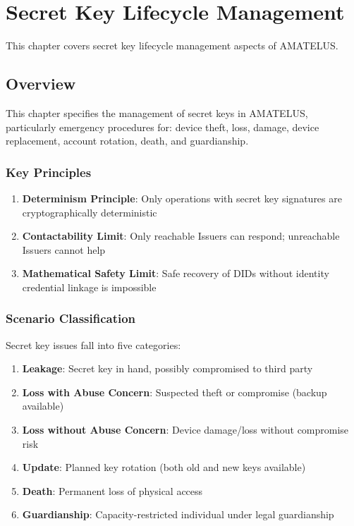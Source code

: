 
\chapter{Secret Key Lifecycle Management}


\begin{definition}
  \label{def:key-chapter}
  This chapter covers secret key lifecycle management aspects of AMATELUS.
  \leanok
\end{definition}
\section{Overview}

This chapter specifies the management of secret keys in AMATELUS, particularly emergency procedures for:
device theft, loss, damage, device replacement, account rotation, death, and guardianship.

\subsection{Key Principles}

\begin{enumerate}
  \item \textbf{Determinism Principle}: Only operations with secret key signatures are cryptographically deterministic
  \item \textbf{Contactability Limit}: Only reachable Issuers can respond; unreachable Issuers cannot help
  \item \textbf{Mathematical Safety Limit}: Safe recovery of DIDs without identity credential linkage is impossible
\end{enumerate}

\subsection{Scenario Classification}

Secret key issues fall into five categories:

\begin{enumerate}
  \item \textbf{Leakage}: Secret key in hand, possibly compromised to third party
  \item \textbf{Loss with Abuse Concern}: Suspected theft or compromise (backup available)
  \item \textbf{Loss without Abuse Concern}: Device damage/loss without compromise risk
  \item \textbf{Update}: Planned key rotation (both old and new keys available)
  \item \textbf{Death}: Permanent loss of physical access
  \item \textbf{Guardianship}: Capacity-restricted individual under legal guardianship
\end{enumerate}

